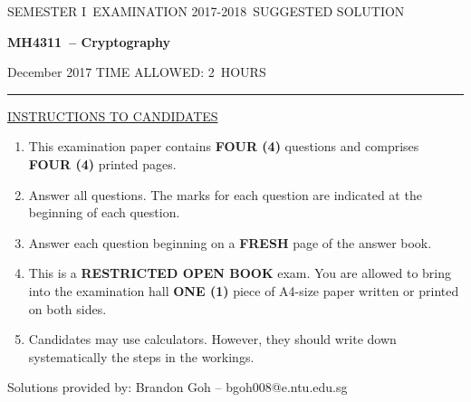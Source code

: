 \documentclass[12pt]{article}
\newcommand{\masunitnumber}{MH4311}
\newcommand{\examdate}{December 2017}
\newcommand{\academicyear}{2017-2018}
\newcommand{\semester}{I}
\newcommand{\coursename}{Cryptography}
\newcommand{\numberofhours}{2}
\begin{document}
\setlength{\headsep}{5truemm}
\setlength{\headheight}{14.5truemm}
\setlength{\voffset}{-0.45truein}
\renewcommand{\headrulewidth}{0.0pt}
\begin{center}
SEMESTER \semester\ EXAMINATION \academicyear ~SUGGESTED SOLUTION
\end{center}
\begin{center}
{\bf \masunitnumber\ -- \coursename}
\end{center}
\vspace{20truemm}

\noindent \examdate\hspace{55truemm} TIME ALLOWED: \numberofhours\ HOURS

\vspace{19truemm}
\hrule
\vspace{19truemm}
\noindent\underline{INSTRUCTIONS TO CANDIDATES}
\vspace{8truemm}
\begin{enumerate}
\item This examination paper contains {\bf FOUR (4)} questions and comprises 
{\bf FOUR (4)} printed pages.

\item Answer all questions. 
The marks for each question are indicated at the beginning of each question.


\item Answer each question beginning on a {\bf FRESH} page of the answer book.

\item This is a {\bf RESTRICTED OPEN BOOK} exam. You are allowed to bring into the examination hall {\bf ONE (1)} piece of A4-size paper written or printed on both sides.

\item Candidates may use calculators. However, they should write down systematically the steps in the workings.
\end{enumerate}

\newpage
\lhead{}
\rhead{\masunitnumber}
\chead{}
\lfoot{}
\cfoot{\thepage}
\rfoot{}
\setlength{\footskip}{45pt}
\noindent Solutions provided by:
Brandon Goh -- bgoh008@e.ntu.edu.sg
\end{document}
